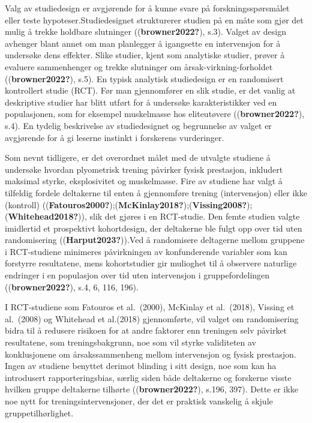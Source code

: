 \documentclass[
  letterpaper,
  DIV=11,
  numbers=noendperiod]{scrreprt}
\begin{document}
Valg av studiedesign er avgjørende for å kunne svare på
forskningsspørsmålet eller teste hypoteser.Studiedesignet strukturerer
studien på en måte som gjør det mulig å trekke holdbare slutninger
((\textbf{browner2022?}), s.3). Valget av design avhenger blant annet om
man planlegger å igangsette en intervensjon for å undersøke dens
effekter. Slike studier, kjent som analytiske studier, prøver å evaluere
sammenhenger og trekke slutninger om årsak-virkning-forholdet
((\textbf{browner2022?}), s.5). En typisk analytisk studiedesign er en
randomisert kontrollert studie (RCT). Før man gjennomfører en slik
studie, er det vanlig at deskriptive studier har blitt utført for å
undersøke karakteristikker ved en populasjonen, som for eksempel
muskelmasse hos eliteutøvere ((\textbf{browner2022?}), s.4). En tydelig
beskrivelse av studiedesignet og begrunnelse av valget er avgjørende for
å gi leserne instinkt i forskerens vurderinger.

Som nevnt tidligere, er det overordnet målet med de utvalgte studiene å
undersøke hvordan plyometrisk trening påvirker fysisk prestasjon,
inkludert maksimal styrke, eksplosivitet og muskelmasse. Fire av
studiene har valgt å tilfeldig fordele deltakerne til enten å
gjennomføre trening (intervensjon) eller ikke (kontroll)
((\textbf{Fatouros2000?});(\textbf{McKinlay2018?});(\textbf{Vissing2008?});(\textbf{Whitehead2018?})),
slik det gjøres i en RCT-studie. Den femte studien valgte imidlertid et
prospektivt kohortdesign, der deltakerne ble fulgt opp over tid uten
randomisering ((\textbf{Harput2023?})).Ved å randomisere deltagerne
mellom gruppene i RCT-studiene minimeres påvirkningen av konfunderende
variabler som kan forstyrre resultatene, mens kohortstudier gir
mulioghet til å observere naturlige endringer i en populasjon over tid
uten intervensjon i gruppefordelingen ((\textbf{browner2022?}), s.4, 6,
116, 196).

I RCT-studiene som Fatouros et al.~(2000), McKinlay et al.~(2018),
Vissing et al.~(2008) og Whitehead et al.(2018) gjennomførte, vil valget
om randomisering bidra til å redusere risikoen for at andre faktorer enn
treningen selv påvirket resultatene, som treningsbakgrunn, noe som vil
styrke validiteten av konklusjonene om årsakssammenheng mellom
intervensjon og fysisk prestasjon. Ingen av studiene benyttet derimot
blinding i sitt design, noe som kan ha introdusert rapporteringsbias,
særlig siden både deltakerne og forskerne visste hvilken gruppe
deltakerne tilhørte ((\textbf{browner2022?}), s.196, 397). Dette er ikke
noe nytt for treningsintervensjoner, der det er praktisk vanskelig å
skjule gruppetilhørlighet.
\end{document}
